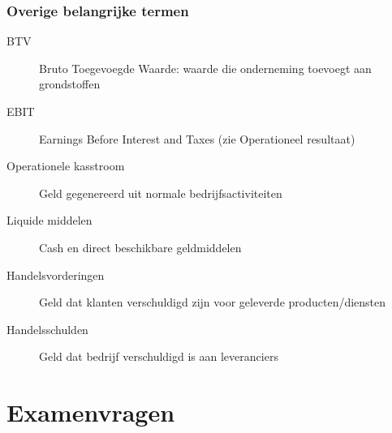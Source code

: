 \documentclass[a4paper,11pt]{article}
\begin{document}
\subsubsection{Overige belangrijke termen}
\begin{description}
    \item[BTV] Bruto Toegevoegde Waarde: waarde die onderneming toevoegt aan grondstoffen
    \item[EBIT] Earnings Before Interest and Taxes (zie Operationeel resultaat)
    \item[Operationele kasstroom] Geld gegenereerd uit normale bedrijfsactiviteiten
    \item[Liquide middelen] Cash en direct beschikbare geldmiddelen
    \item[Handelsvorderingen] Geld dat klanten verschuldigd zijn voor geleverde producten/diensten
    \item[Handelsschulden] Geld dat bedrijf verschuldigd is aan leveranciers
\end{description}


\section{Examenvragen}
\end{document}
